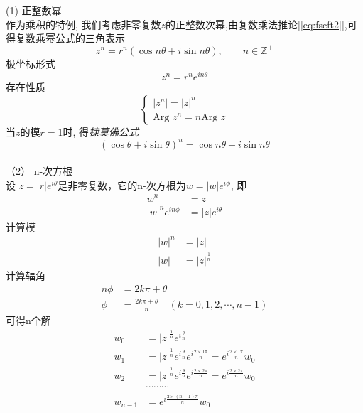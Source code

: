 \noindent (1) 正整数幂 \\
作为乘积的特例, 我们考虑非零复数$z$的正整数次幂,由复数乘法推论[\ref{eq:fscft2}],可得复数乘幂公式的三角表示
\begin{equation}\label{}
    z^n =  r^n (\cos n \theta + i \sin n \theta) , \qquad n \in \mathbb{Z}^+  
\end{equation}
极坐标形式
\begin{equation}\label{}
    z^n =  r^n e^{i n \theta}
\end{equation}
存在性质
\begin{equation}\label{}
\begin{cases}
   \left\vert z^n\right\vert = \left\vert z\right\vert^n \\ 
   \text{Arg } z^n  = n \text{Arg }z
\end{cases}
\end{equation}
当$z$的模$r=1$时, 得\emph{棣莫佛公式 }
\begin{equation}\label{}
     (\cos \theta + i \sin  \theta)^n = \cos n \theta + i \sin n \theta
\end{equation}
~\\
\noindent （2） n-次方根 \\
	设 $z=|r| e^{i \theta }$是非零复数，它的n-次方根为$w = |w| e^{i \phi } $, 即
	\[ \begin{aligned}
		w^n &= z \\ 
		|w| ^n  e^{i n\phi } &= |z| e^{i \theta } 
	\end{aligned}\]
	计算模 
	\[ \begin{aligned}
		|w|^n  &= |z| \\ 
		|w| &= |z|^{\frac{1}{n}}
	\end{aligned}\]
	计算辐角
	\[ \begin{aligned}
		n\phi  &= 2 k \pi +\theta \\ 
		\phi  &= \frac{2 k \pi +\theta}{n} \quad (k=0,1,2,\cdots , n-1)
	\end{aligned}\]
    可得n个解
    \[ \begin{aligned}
     w_0 &= |z|^{\frac{1}{n}} e^{i \frac{\theta}{n}} \\ 
     w_1 &= |z|^{\frac{1}{n}} e^{i \frac{\theta}{n}} e^{i \frac{2\times 1\pi}{n}} = e^{i \frac{2\times1\pi}{n}} w_0  \\ 
     w_2 &= |z|^{\frac{1}{n}} e^{i \frac{\theta}{n}} e^{i \frac{2\times 2\pi}{n}} = e^{i \frac{2\times 2\pi}{n}} w_0  \\ 
     ~~ ~~ & \cdots\cdots\cdots   \\
     w_{n-1} &= e^{i \frac{2\times (n-1)\pi}{n}} w_0 
    \end{aligned}\]
